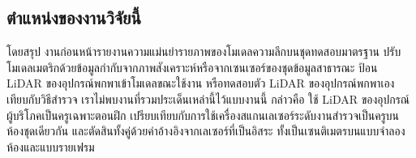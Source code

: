 \subsection{ตำแหน่งของงานวิจัยนี้}
โดยสรุป งานก่อนหน้ารายงานความแม่นยำรายภาพของโมเดลความลึกบนชุดทดสอบมาตรฐาน
ปรับโมเดลเมตริกด้วยข้อมูลกำกับจากภาพสังเคราะห์หรือจากเซนเซอร์ของชุดข้อมูลสาธารณะ
ป้อน LiDAR ของอุปกรณ์พกพาเข้าโมเดลขณะใช้งาน หรือทดสอบตัว LiDAR ของอุปกรณ์พกพาเองเทียบกับวิธีสำรวจ
เราไม่พบงานที่รวมประเด็นเหล่านี้ไว้แบบงานนี้ กล่าวคือ ใช้ LiDAR ของอุปกรณ์ผู้บริโภคเป็นครูเฉพาะตอนฝึก
เปรียบเทียบกับการใช้เครื่องสแกนเลเซอร์ระดับงานสำรวจเป็นครูบนห้องชุดเดียวกัน
และตัดสินทั้งคู่ด้วยค่าอ้างอิงจากเลเซอร์ที่เป็นอิสระ ทั้งเป็นเซนติเมตรบนแบบจำลองห้องและแบบรายเฟรม

